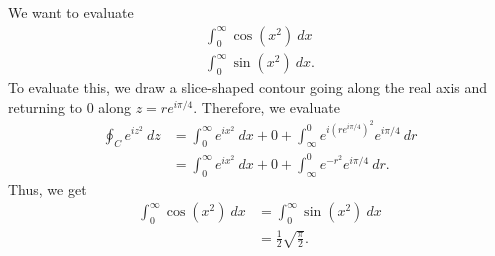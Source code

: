 \documentclass[10pt]{mypackage}
\begin{document}
   \begin{example}
     We want to evaluate
     \begin{align*}
       \int_{0}^{\infty} \cos\left( x^2 \right)\:dx\\
       \int_{0}^{\infty} \sin\left( x^2 \right)\:dx.
     \end{align*}
     To evaluate this, we draw a slice-shaped contour going along the real axis and returning to $0$ along $z = re^{i\pi/4}$. Therefore, we evaluate
     \begin{align*}
       \oint_{C}e^{iz^2}\:dz &= \int_{0}^{\infty} e^{ix^2}\:dx + 0 + \int_{\infty}^{0} e^{i\left( re^{i\pi/4} \right)^2}e^{i\pi/4}\:dr\\
                             &= \int_{0}^{\infty} e^{ix^2}\:dx + 0 + \int_{\infty}^{0} e^{-r^2}e^{i\pi/4}\:dr.
     \end{align*}
     Thus, we get
     \begin{align*}
       \int_{0}^{\infty} \cos\left( x^2 \right)\:dx &= \int_{0}^{\infty} \sin\left( x^2 \right)\:dx\\
                                                     &= \frac{1}{2}\sqrt{\frac{\pi}{2}}.
     \end{align*}
   \end{example}
\end{document}
